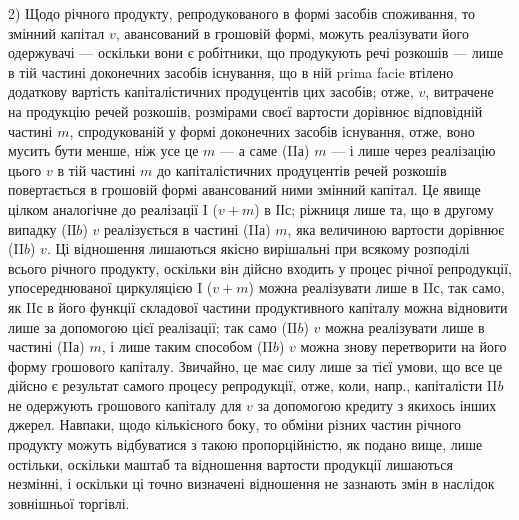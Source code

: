 2) Щодо річного продукту, репродукованого в формі засобів споживання,
то змінний капітал $v$, авансований в грошовій формі, можуть реалізувати
його одержувачі — оскільки вони є робітники, що продукують
речі розкошів — лише в тій частині доконечних засобів існування, що в
ній prima facie втілено додаткову вартість капіталістичних продуцентів
цих засобів; отже, $v$, витрачене на продукцію речей розкошів, розмірами
своєї вартости дорівнює відповідній частині $m$, спродукованій у
формі доконечних засобів існування, отже, воно мусить бути менше, ніж
усе це $m$ — а саме (II$а$) $m$ — і лише через реалізацію цього $v$ в тій частині
$m$ до капіталістичних продуцентів речей розкошів повертається в грошовій
формі авансований ними змінний капітал. Це явище цілком аналогічне
до реалізації I ($v + m$) в ІІ$с$; ріжниця лише та, що в другому випадку
(IІ$b$) $v$ реалізується в частині (II$а$) $m$, яка величиною вартости дорівнює
(II$b$) $v$. Ці відношення лишаються якісно вирішальні при всякому
розподілі всього річного продукту, оскільки він дійсно входить у процес
річної репродукції, упосереднюваної циркуляцією I ($v + m$) можна реалізувати
лише в II$с$, так само, як II$с$ в його функції складової частини
продуктивного капіталу можна відновити лише за допомогою цієї реалізації;
так само (II$b$) $v$ можна реалізувати лише в частині (II$а$) $m$, і лише
таким способом (II$b$) $v$ можна знову перетворити на його форму грошового
капіталу. Звичайно, це має силу лише за тієї умови, що все це дійсно
є результат самого процесу репродукції, отже, коли, напр., капіталісти
II$b$ не одержують грошового капіталу для $v$ за допомогою кредиту з
якихось інших джерел. Навпаки, щодо кількісного боку, то обміни різних
частин річного продукту можуть відбуватися з такою пропорційністю, як
подано вище, лише остільки, оскільки маштаб та відношення вартости
продукції лишаються незмінні, і оскільки ці точно визначені відношення
не зазнають змін в наслідок зовнішньої торгівлі.

